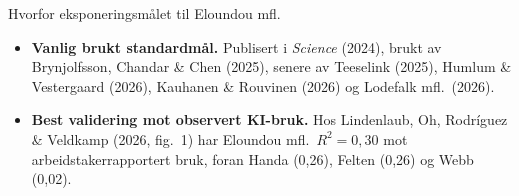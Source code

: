 
\begin{frame}{Hvorfor eksponeringsmålet til Eloundou mfl.}
\hypertarget{after-eloundou}{}
\begin{itemize}\setlength{\itemsep}{10pt}
  \item \textbf{Vanlig brukt standardmål.} Publisert i \textit{Science} (2024), brukt av Brynjolfsson, Chandar \& Chen (2025), senere av Teeselink (2025), Humlum \& Vestergaard (2026), Kauhanen \& Rouvinen (2026) og Lodefalk mfl.\ (2026).
  \item \textbf{Best validering mot observert KI-bruk.} Hos Lindenlaub, Oh, Rodríguez \& Veldkamp (2026, fig.\ 1) har Eloundou mfl.\ $R^2 = 0{,}30$ mot arbeidstakerrapportert bruk, foran Handa (0,26), Felten (0,26) og Webb (0,02).
\end{itemize}

\vspace{1.2em}
\hfill\hyperlink{lorv-detail}{}
\end{frame}
